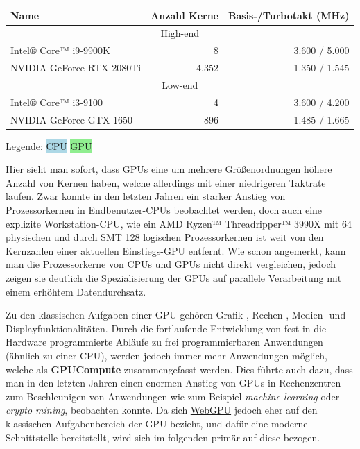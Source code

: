 \documentclass[oneside]{ausarbeitung}
\begin{document}
\begin{minipage}{1.0\textwidth}
\begin{center}
\begin{tabular}{ |l|r|r| }
    \hline
    Name & Anzahl Kerne & Basis-/Turbotakt (MHz) \\
    \hline
    \multicolumn{3}{|c|}{High-end} \\
    \hline
    \rowcolor{lightblue}
    Intel® Core™ i9-9900K \cite{intel:i9_9900k} & 8 & 3.600 / 5.000 \\
    \rowcolor{lightgreen}
    NVIDIA GeForce RTX 2080Ti \cite{nvidia:rtx_2080ti} & 4.352 & 1.350 / 1.545 \\
    \hline
    \multicolumn{3}{|c|}{Low-end} \\
    \hline
    \rowcolor{lightblue}
    Intel® Core™ i3-9100 \cite{intel:i3_9100} & 4 & 3.600 / 4.200 \\
    \rowcolor{lightgreen}
    NVIDIA GeForce GTX 1650 \cite{nvidia:gtx_1650} & 896 & 1.485 / 1.665 \\
    \hline
\end{tabular}
\end{center}
Legende: \colorbox{lightblue}{\ac{CPU}} \colorbox{lightgreen}{\ac{GPU}}
\end{minipage}

Hier sieht man sofort, dass \ac{GPU}s eine um mehrere Größenordnungen höhere Anzahl von Kernen haben, welche allerdings mit einer niedrigeren Taktrate laufen. Zwar konnte in den letzten Jahren ein starker Anstieg von Prozessorkernen in Endbenutzer-\ac{CPU}s beobachtet werden, doch auch eine explizite Workstation-\ac{CPU}, wie ein AMD Ryzen™ Threadripper™ 3990X \cite{amd:threadripper_3990x} mit 64 physischen und durch \ac{SMT} 128 logischen Prozessorkernen ist weit von den Kernzahlen einer aktuellen Einstiegs-\ac{GPU} entfernt. Wie schon angemerkt, kann man die Prozessorkerne von \ac{CPU}s und \ac{GPU}s nicht direkt vergleichen, jedoch zeigen sie deutlich die Spezialisierung der \ac{GPU}s auf parallele Verarbeitung mit einem erhöhtem Datendurchsatz. 

Zu den klassischen Aufgaben einer \ac{GPU} gehören Grafik-, Rechen-, Medien- und Displayfunktionalitäten. Durch die fortlaufende Entwicklung von fest in die Hardware programmierte Abläufe zu frei programmierbaren Anwendungen (ähnlich zu einer \ac{CPU}), werden jedoch immer mehr Anwendungen möglich, welche als \textbf{GPUCompute} zusammengefasst werden. Dies führte auch dazu, dass man in den letzten Jahren einen enormen Anstieg von \ac{GPU}s in Rechenzentren zum Beschleunigen von Anwendungen wie zum Beispiel \textit{machine learning} oder \textit{crypto mining}, beobachten konnte. Da sich \hyperref[cha:webgpu]{WebGPU} jedoch eher auf den klassischen Aufgabenbereich der \ac{GPU} bezieht, und dafür eine moderne Schnittstelle bereitstellt, wird sich im folgenden primär auf diese bezogen.
\end{document}
